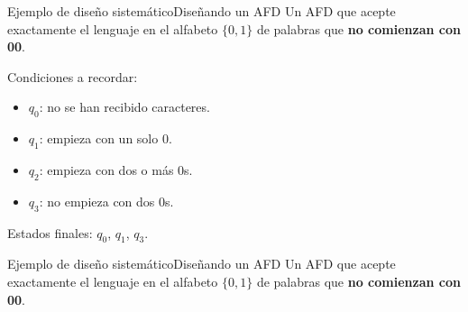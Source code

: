 \documentclass[spanish]{beamer}
\begin{document}
\begin{frame}{Ejemplo de diseño sistemático}{Diseñando un AFD}
    Un AFD que acepte exactamente el lenguaje en el alfabeto $\{0,1\}$ de palabras que \textbf{no comienzan con 00}. \pause

    \bigskip

    Condiciones a recordar: \pause

    \begin{itemize}
        \item $q_0$: no se han recibido caracteres. \pause
        \item $q_1$: empieza con un solo $0$. \pause
        \item $q_2$: empieza con dos o más $0$s. \pause
        \item $q_3$: no empieza con dos $0$s. \pause
    \end{itemize}

    Estados finales: $q_0$, $q_1$, $q_3$.
    
\end{frame}

\begin{frame}{Ejemplo de diseño sistemático}{Diseñando un AFD}
    Un AFD que acepte exactamente el lenguaje en el alfabeto $\{0,1\}$ de palabras que \textbf{no comienzan con 00}.

    \begin{center}
    \end{center}
\end{frame}
\end{document}
